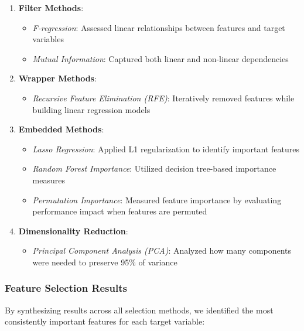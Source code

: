 \documentclass[12pt,a4paper]{article}
\begin{document}
\begin{enumerate}
    \item \textbf{Filter Methods}:
    \begin{itemize}
        \item \textit{F-regression}: Assessed linear relationships between features and target variables
        \item \textit{Mutual Information}: Captured both linear and non-linear dependencies
    \end{itemize}
    
    \item \textbf{Wrapper Methods}:
    \begin{itemize}
        \item \textit{Recursive Feature Elimination (RFE)}: Iteratively removed features while building linear regression models
    \end{itemize}
    
    \item \textbf{Embedded Methods}:
    \begin{itemize}
        \item \textit{Lasso Regression}: Applied L1 regularization to identify important features
        \item \textit{Random Forest Importance}: Utilized decision tree-based importance measures
        \item \textit{Permutation Importance}: Measured feature importance by evaluating performance impact when features are permuted
    \end{itemize}
    
    \item \textbf{Dimensionality Reduction}:
    \begin{itemize}
        \item \textit{Principal Component Analysis (PCA)}: Analyzed how many components were needed to preserve 95\% of variance
    \end{itemize}
\end{enumerate}

\subsubsection{Feature Selection Results}

By synthesizing results across all selection methods, we identified the most consistently important features for each target variable:
\end{document}
